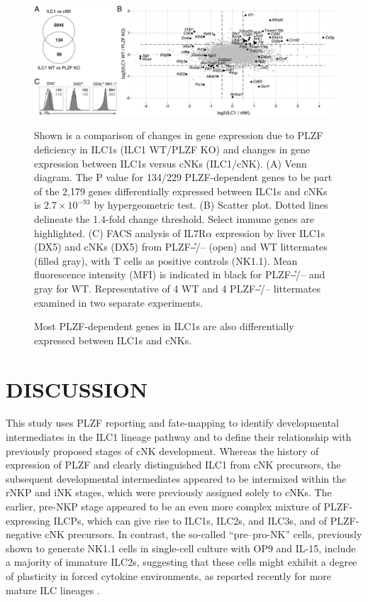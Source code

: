 \begin{figure}[p]
\begin{center}
	\includegraphics[width=\textwidth]{figures/chapter2/F4}
\end{center}
	\caption{Most PLZF-dependent genes in ILC1s are also differentially expressed between ILC1s and cNKs.} 
	 Shown is a comparison of changes in gene expression due to PLZF deficiency in ILC1s (ILC1 WT/PLZF KO) and changes in gene expression between ILC1s versus cNKs (ILC1/cNK). (A) Venn diagram. The P value for 134/229 PLZF-dependent genes to be part of the 2,179 genes differentially expressed between ILC1s and cNKs is $2.7 \times 10^{−93}$ by hypergeometric test. (B) Scatter plot. Dotted lines delineate the 1.4-fold change threshold. Select immune genes are highlighted. (C) FACS analysis of IL7R$\alpha$ expression by liver ILC1s (DX5\UM) and cNKs (DX5\UP) from PLZF\U{--/--} (open) and WT littermates (filled gray), with T cells as positive controls (\CDte\UP NK1.1\UM). Mean fluorescence intensity (MFI) is indicated in black for PLZF\U{--/--} and gray for WT. Representative of 4 WT and 4 PLZF\U{--/--} littermates examined in two separate experiments.
	\label{fig:chap2_F4}
\end{figure}

\section{DISCUSSION}

This study uses PLZF reporting and fate-mapping to identify developmental intermediates in the ILC1 lineage pathway and to define their relationship with previously proposed stages of cNK development. Whereas the history of expression of PLZF and \ab{} clearly distinguished ILC1 from cNK precursors, the subsequent developmental intermediates appeared to be intermixed within the rNKP and iNK stages, which were previously assigned solely to cNKs. The earlier, pre-NKP stage appeared to be an even more complex mixture of PLZF-expressing ILCPs, which can give rise to ILC1s, ILC2s, and ILC3s, and of PLZF-negative cNK precursors. In contrast, the so-called “pre–pro-NK” cells, previously shown to generate NK1.1\UP{} cells in single-cell culture with OP9 and IL-15, include a majority of immature ILC2s, suggesting that these cells might exhibit a degree of plasticity in forced cytokine environments, as reported recently for more mature ILC lineages \cite{klose2013,huang2015}.

